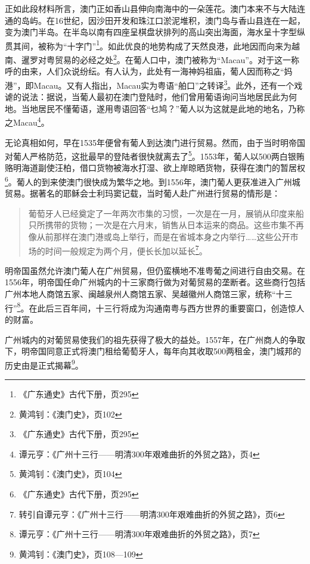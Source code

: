 正如此段材料所言，澳门正如香山县伸向南海中的一朵莲花。澳门本来不与大陆连通的岛屿。在16世纪，因沙田开发和珠江口淤泥堆积，澳门岛与香山县连在一起，变为澳门半岛。在半岛以南有四座呈棋盘状排列的高山突出海面，海水呈十字型纵贯其间，被称为“十字门”\footnote{《广东通史》古代下册，页295}。如此优良的地势构成了天然良港，此地因而向来为越南、暹罗对粤贸易的必经之处\footnote{黄鸿钊：《澳门史》，页102}。在葡人口中，澳门被称为“Macau”。对于这一称呼的由来，人们众说纷纭。有人认为，此处有一海神妈祖庙，葡人因而称之“妈港”，即Macau。又有人指出，Macau实为粤语“舶口”之转译\footnote{《广东通史》古代下册，页295}。此外，还有一个戏谑的说法：据说，当葡人最初在澳门登陆时，他们曾用葡语询问当地居民此为何地。当地居民不懂葡语，遂用粤语回答“乜鸠？”葡人以为这就是此地的地名，乃称之Macau\footnote{谭元亨：《广州十三行——明清300年艰难曲折的外贸之路》，页4}。

无论真相如何，早在1535年便曾有葡人到达澳门进行贸易。然而，由于当时明帝国对葡人严格防范，这批最早的登陆者很快就离去了\footnote{黄鸿钊：《澳门史》，页104}。1553年，葡人以500两白银贿赂明海道副使汪柏，借口货物被海水打湿、欲上岸晾晒货物，获得在澳门的暂居权\footnote{《广东通史》古代下册，页295}。葡人的到来使澳门很快成为繁华之地。到1556年，澳门葡人更获准进入广州城贸易。据著名的耶稣会士利玛窦记载，当时葡人赴广州进行贸易的情形是：

\begin{quote}

葡萄牙人已经奠定了一年两次市集的习惯，一次是在一月，展销从印度来船只所携带的货物；一次是在六月末，销售从日本运来的商品。这些市集不再像从前那样在澳门港或岛上举行，而是在省城本身之内举行……这些公开市场的时间一般规定为两个月，便长长加以延长\footnote{转引自谭元亨：《广州十三行——明清300年艰难曲折的外贸之路》，页6}。

\end{quote}

明帝国虽然允许澳门葡人在广州贸易，但仍蛮横地不准粤葡之间进行自由交易。在1556年，明帝国任命广州城内的十三家商行做为对葡贸易的垄断者。这些商行包括广州本地人商馆五家、闽越泉州人商馆五家、吴越徽州人商馆三家，统称“十三行”\footnote{谭元亨：《广州十三行——明清300年艰难曲折的外贸之路》，页7}。在此后三百年间，十三行将成为沟通南粤与西方世界的重要窗口，创造惊人的财富。

广州城内的对葡贸易使我们的祖先获得了极大的益处。1557年，在广州商人的争取下，明帝国同意正式将澳门租给葡萄牙人，每年向其收取500两租金，澳门城邦的历史由是正式揭幕\footnote{黄鸿钊：《澳门史》，页108—109}。

